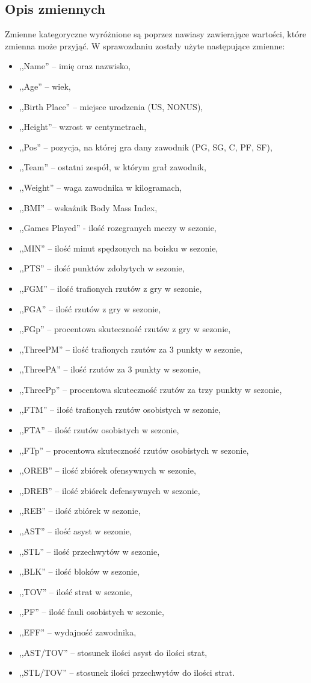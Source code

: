 \documentclass[11pt,a4paper]{article}
\begin{document}
\subsection{Opis zmiennych}
Zmienne kategoryczne wyróżnione są poprzez nawiasy zawierające wartości, które zmienna może przyjąć. W sprawozdaniu zostały użyte następujące zmienne:
\begin{itemize}
	\item ,,Name'' -- imię oraz nazwisko,
	\item ,,Age'' -- wiek,
	\item ,,Birth Place'' -- miejsce urodzenia (US, NONUS),
	\item ,,Height''-- wzrost w centymetrach,
	\item ,,Pos'' -- pozycja, na której gra dany zawodnik (PG, SG, C, PF, SF),
	\item ,,Team'' -- ostatni zespół, w którym grał zawodnik,
	\item ,,Weight'' -- waga zawodnika w kilogramach,	
	\item ,,BMI'' -- wskaźnik Body Mass Index, 
	\item ,,Games Played'' - ilość rozegranych meczy w sezonie,	
	\item ,,MIN'' -- ilość minut spędzonych na boisku w sezonie,
	\item ,,PTS'' -- ilość punktów zdobytych w sezonie,
	\item ,,FGM'' -- ilość trafionych rzutów z gry w sezonie,
	\item ,,FGA'' -- ilość rzutów z gry w sezonie,
	\item ,,FGp'' -- procentowa skuteczność rzutów z gry w sezonie,
	\item ,,ThreePM'' -- ilość trafionych rzutów za 3 punkty w sezonie,
	\item ,,ThreePA'' -- ilość rzutów za 3 punkty w sezonie,
	\item ,,ThreePp'' -- procentowa skuteczność rzutów za trzy punkty w sezonie,
	\item ,,FTM'' -- ilość trafionych rzutów osobistych w sezonie,
	\item ,,FTA'' -- ilość rzutów osobistych w sezonie,
	\item ,,FTp'' -- procentowa skuteczność rzutów osobistych w sezonie,
	\item ,,OREB'' -- ilość zbiórek ofensywnych w sezonie,	
	\item ,,DREB'' -- ilość zbiórek defensywnych w sezonie,	
	\item ,,REB'' -- ilość zbiórek w sezonie,
	\item ,,AST'' -- ilość asyst w sezonie,
	\item ,,STL'' -- ilość przechwytów w sezonie,
	\item ,,BLK'' -- ilość bloków w sezonie,
	\item ,,TOV'' -- ilość strat w sezonie,
	\item ,,PF'' -- ilość fauli osobistych w sezonie,
	\item ,,EFF'' -- wydajność zawodnika,
	\item ,,AST/TOV'' -- stosunek ilości asyst do ilości strat,
	\item ,,STL/TOV'' -- stosunek ilości przechwytów do ilości strat.
\end{itemize}
\end{document}
